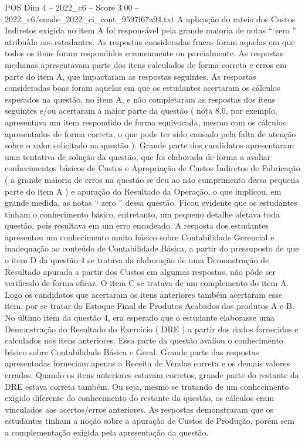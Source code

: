 \begin{textsample}{POS Dim 4 – 2022\_c6 – Score 3.00 – 2022\_c6/enade\_2022\_ci\_cont\_9597f67a94.txt}
A aplicação do rateio dos Custos Indiretos exigida no item A foi responsável pela grande maioria de notas “ zero ” atribuída aos estudantes.
As respostas consideradas fracas foram aquelas em que todos os itens foram respondidos erroneamente ou parcialmente.
As respostas medianas apresentavam parte dos itens calculados de forma correta e erros em parte do item A, que impactaram as respostas seguintes.
As respostas consideradas boas foram aquelas em que os estudantes acertaram os cálculos esperados na questão, no item A, e não completaram as respostas dos itens seguintes e/ou acertaram a maior parte da questão ( nota 8,0, por exemplo, apresentava um item respondido de forma equivocada, mesmo com os cálculos apresentados de forma correta, o que pode ter sido causado pela falta de atenção sobre o valor solicitado na questão ).
Grande parte dos candidatos apresentaram uma tentativa de solução da questão, que foi elaborada de forma a avaliar conhecimentos básicos de Custos e Apropriação de Custos Indiretos de Fabricação ( a grande maioria de erros na questão se deu ao não cumprimento dessa pequena parte do item A ) e apuração do Resultado da Operação, o que implicou, em grande medida, as notas “ zero ” dessa questão.
Ficou evidente que os estudantes tinham o conhecimento básico, entretanto, um pequeno detalhe afetava toda questão, pois resultava em um erro encadeado.
A resposta dos estudantes apresentou um conhecimento muito básico sobre Contabilidade Gerencial e inadequação ao conteúdo de Contabilidade Básica, a partir do pressuposto de que o item D da questão 4 se tratava da elaboração de uma Demonstração de Resultado apurada a partir dos Custos em algumas respostas, não pôde ser verificado de forma eficaz.
O item C se tratava de um complemento do item A.
Logo os candidatos que acertaram os itens anteriores também acertaram esse item, por se tratar do Estoque Final de Produtos Acabados dos produtos A e B.
No último item da questão 4, era esperado que o estudante elaborasse uma Demonstração do Resultado do Exercício ( DRE ) a partir dos dados fornecidos e calculados nos itens anteriores.
Essa parte da questão avaliou o conhecimento básico sobre Contabilidade Básica e Geral.
Grande parte das respostas apresentadas forneciam apenas a Receita de Vendas correta e os demais valores errados.
Quando os itens anteriores estavam corretos, grande parte do restante da DRE estava correta também.
Ou seja, mesmo se tratando de um conhecimento exigido diferente do conhecimento do restante da questão, os cálculos eram vinculados aos acertos/erros anteriores.
As respostas demonstraram que os estudantes tinham a noção sobre a apuração de Custos de Produção, porém sem a complementação exigida pela apresentação da questão.

\end{textsample}
